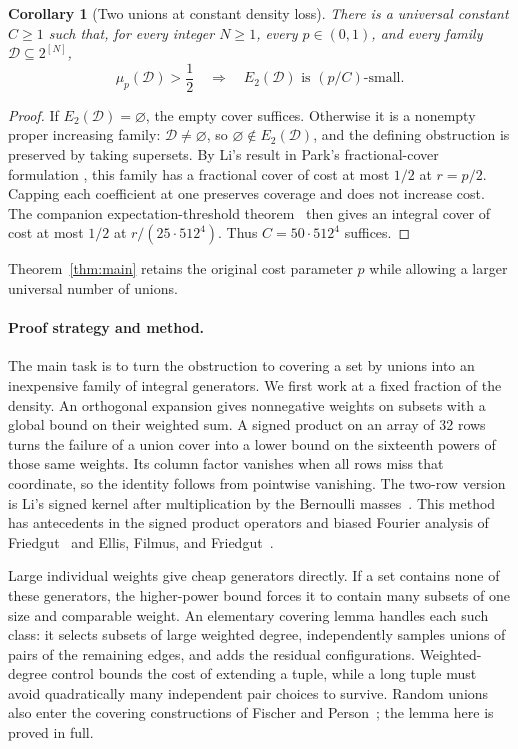 \documentclass[11pt,letterpaper]{article}
\newtheorem{corollary}[theorem]{Corollary}
\theoremstyle{definition}
\theoremstyle{remark}
\numberwithin{equation}{section}
\begin{document}
\begin{corollary}[Two unions at constant density loss]
\label{cor:two-union}
There is a universal constant $C\ge1$ such that, for every integer $N\ge1$,
every $p\in(0,1)$, and every family $\mathcal D\subseteq2^{[N]}$,
\[
\mu_p(\mathcal D)>\frac12
\quad\Longrightarrow\quad
E_2(\mathcal D)\text{ is }(p/C)\text{-small}.
\]
\end{corollary}

\begin{proof}
If $E_2(\mathcal D)=\varnothing$, the empty cover suffices. Otherwise
it is a nonempty proper increasing family: $\mathcal D\ne\varnothing$,
so $\varnothing\notin E_2(\mathcal D)$, and the defining obstruction
is preserved by taking supersets. By Li's result
\cite[Corollary~3.1]{Li26} in Park's fractional-cover formulation
\cite[Theorem~3.4]{Park26}, this family has a fractional cover of cost
at most $1/2$ at $r=p/2$. Capping each coefficient at one preserves
coverage and does not increase cost. The companion expectation-threshold
theorem~\cite[Theorem~1.1]{OpenAIThreshold26} then gives an integral cover
of cost at most $1/2$ at
$r/(25\cdot512^4)$. Thus $C=50\cdot512^4$ suffices.
\end{proof}

Theorem~\ref{thm:main} retains the original cost parameter $p$ while
allowing a larger universal number of unions.

\paragraph{Proof strategy and method.}
The main task is to turn the obstruction to covering a set by unions
into an inexpensive family of integral generators. We first work at a
fixed fraction of the density. An orthogonal expansion gives nonnegative
weights on subsets with a global bound on their weighted sum. A signed
product on an array of 32 rows turns the failure of a union cover into
a lower bound on the sixteenth powers of those same weights. Its column
factor vanishes when all rows miss that coordinate, so the identity
follows from pointwise vanishing. The two-row version is Li's signed
kernel after multiplication by the Bernoulli masses~\cite[Section~2]{Li26}.
This method has antecedents
in the signed product operators and biased Fourier analysis of
Friedgut~\cite[Section~2.2]{Friedgut08} and Ellis, Filmus, and
Friedgut~\cite[Sections~2.2 and~4.1]{EllisFilmusFriedgut12}.

Large individual weights give cheap generators directly. If a set
contains none of these generators, the higher-power bound forces it
to contain many subsets of one size and comparable weight. An elementary
covering lemma handles each such class: it selects subsets of large
weighted degree, independently samples unions of pairs of the remaining
edges, and adds the residual configurations. Weighted-degree control
bounds the cost of extending a tuple, while a long tuple must avoid
quadratically many independent pair choices to survive. Random unions
also enter the covering constructions of Fischer and
Person~\cite[Sections~1.1 and~2]{FischerPerson25}; the lemma here is proved
in full.
\end{document}
